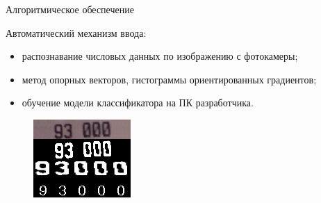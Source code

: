 \documentclass[hyperref={pdftex,unicode}]{beamer}
\begin{document}
\begin{frame}{Алгоритмическое обеспечение}
  \begin{minipage}{0.6\linewidth}
  Автоматический механизм ввода:
  \begin{itemize}
    \item распознавание числовых данных по изображению с фотокамеры;
    \item метод опорных векторов, гистограммы ориентированных градиентов;
    \item обучение модели классификатора на ПК разработчика.
  \end{itemize}
  \end{minipage}
  \hfill
  \begin{minipage}{0.35\linewidth}
    \begin{figure}[h!]
      \centering
      \includegraphics[width=\textwidth]{fig/implementation_cv_recognition.png}
    \end{figure}
  \end{minipage}
\end{frame}
\end{document}
